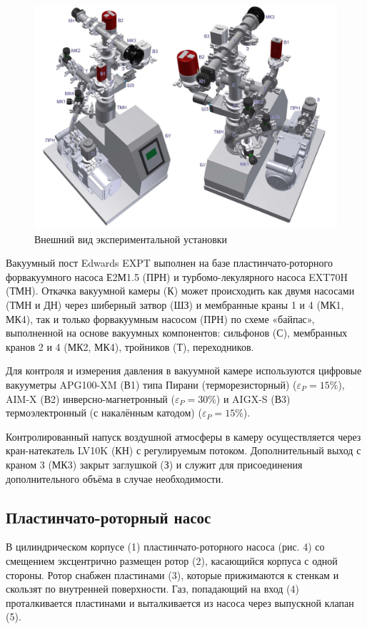 \documentclass[14pt, a4paper]{report}
\begin{document}
\begin{figure}[!ht]
\centering
\includegraphics[scale=0.4]{terma5_01.png}
\caption{Внешний вид экспериментальной установки}
\end{figure}

Вакуумный пост Edwards EXPT выполнен на базе пластинчато-роторного форвакуумного насоса Е2М1.5 (ПРН) и турбомо-лекулярного насоса EXT70H (ТМН). Откачка вакуумной камеры (К) может происходить как двумя насосами (ТМН и ДН) через шиберный затвор (ШЗ) и мембранные краны 1 и 4 (МК1, МК4), так и только форвакуумным насосом (ПРН) по схеме «байпас», выполненной на основе вакуумных компонентов: сильфонов (С), мембранных кранов 2 и 4 (МК2, МК4), тройников (Т), переходников.

Для контроля и измерения давления в вакуумной камере используются цифровые вакууметры APG100-XM (В1) типа Пирани (терморезисторный) ($\varepsilon_P=15\%$), AIM-X (В2) инверсно-магнетронный ($\varepsilon_P=30\%$) и AIGX-S (В3) термоэлектронный (с накалённым катодом) ($\varepsilon_P=15\%$).

Контролированный напуск воздушной атмосферы в камеру осуществляется через кран-натекатель LV10K (КН) с регулируемым потоком. Дополнительный выход с краном 3 (МК3) закрыт заглушкой (З) и служит для присоединения дополнительного объёма в случае необходимости.

\subsection{Пластинчато-роторный насос}

В цилиндрическом корпусе (1) пластинчато-роторного насоса (рис. 4) со смещением эксцентрично размещен ротор (2), касающийся корпуса с одной стороны. Ротор снабжен пластинами (3), которые прижимаются к стенкам и скользят по внутренней поверхности. Газ, попадающий на вход (4) проталкивается пластинами и выталкивается из насоса через выпускной клапан (5).
\end{document}
